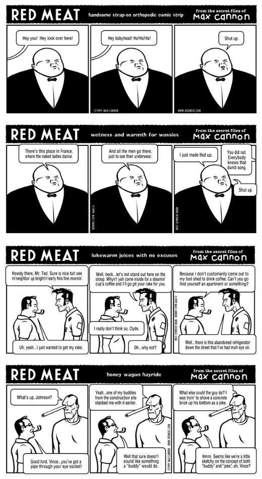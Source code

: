 \documentclass[a4paper,twoside,11pt]{article}
\begin{document}
\includegraphics[width=\textwidth]{redmeat_1999-12-20.png}



\includegraphics[width=\textwidth]{redmeat_1999-12-27.png}



\includegraphics[width=\textwidth]{redmeat_2000-01-03.png}



\includegraphics[width=\textwidth]{redmeat_2000-01-10.png}
\end{document}
